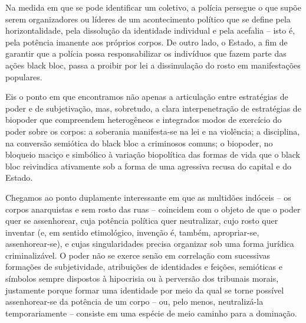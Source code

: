 Na medida em que se pode identificar um coletivo, a polícia persegue o
que supõe serem organizadores ou líderes de um acontecimento político
que se define pela horizontalidade, pela dissolução da identidade
individual e pela acefalia -- isto é, pela potência imanente aos
próprios corpos. De outro lado, o Estado, a fim de garantir que a
polícia possa responsabilizar os indivíduos que fazem parte das ações
black bloc, passa a proibir por lei a dissimulação do rosto em
manifestações populares.

Eis o ponto em que encontramos não apenas a articulação entre
estratégias de poder e de subjetivação, mas, sobretudo, a clara
interpenetração de estratégias de biopoder que compreendem heterogêneos
e integrados modos de exercício do poder sobre os corpos: a soberania
manifesta-se na lei e na violência; a disciplina, na conversão semiótica
do black bloc a criminosos comuns; o biopoder, no bloqueio maciço e
simbólico à variação biopolítica das formas de vida que o black bloc
reivindica ativamente sob a forma de uma agressiva recusa do capital e
do Estado.

Chegamos ao ponto duplamente interessante em que as multidões indóceis
-- os corpos anarquistas e sem rosto das ruas -- coincidem com o objeto
de que o poder quer se assenhorear, cuja potência política quer
neutralizar, cujo rosto quer inventar (e, em sentido etimológico,
invenção é, também, apropriar-se, assenhorear-se), e cujas
singularidades precisa organizar sob uma forma jurídica criminalizável.
O poder não se exerce senão em correlação com sucessivas formações de
subjetividade, atribuições de identidades e feições, semióticas e
símbolos sempre dispostos à hipocrisia ou à perversão dos tribunais
morais, justamente porque formar uma identidade por meio da qual se
torne possível assenhorear-se da potência de um corpo -- ou, pelo menos,
neutralizá-la temporariamente -- consiste em uma espécie de meio caminho
para a dominação.

